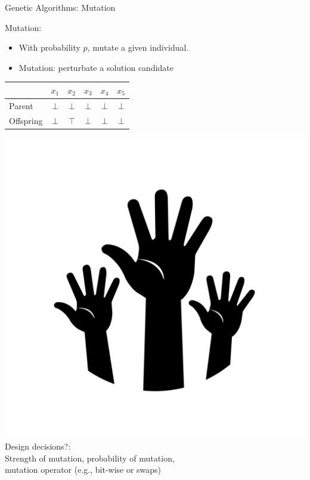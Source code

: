 \begin{frame}[c]{Genetic Algorithms: Mutation}

\begin{block}{Mutation:}
\begin{itemize}
  \item With probability $p$, mutate a given individual.
  \item Mutation: perturbate a solution candidate 
\end{itemize}
\end{block}

\pause
\bigskip

\centering
\begin{tabular}{lccccc}
& $x_1$ & $x_2$ & $x_3$ & $x_4$ & $x_5$\\
\hline
Parent & $\bot$ & $\bot$ & $\bot$ & $\bot$ & $\bot$ \\
\pause
Offspring & $\bot$ & $\top$ & $\bot$ & $\bot$ & $\bot$ \\
\end{tabular}

\pause
\medskip
\includegraphics[scale=.03]{images/hands.png}
\alert{Design decisions?}:\\
\pause Strength of mutation, probability of mutation,\\
mutation operator (e.g., bit-wise or swaps)


\end{frame}
